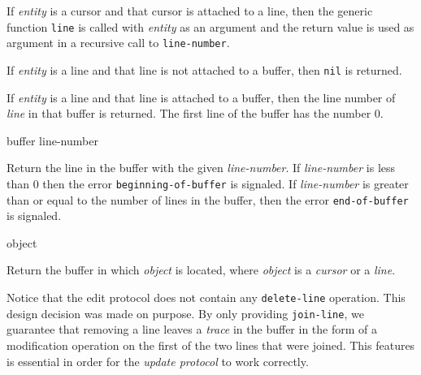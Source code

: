 If \textit{entity} is a cursor and that cursor is attached to a line,
then the generic function \texttt{line}  is
called with \textit{entity} as an argument and the return value is
used as argument in a recursive call to \texttt{line-number}.

If \textit{entity} is a line and that line is not attached to a
buffer, then \texttt{nil} is returned.

If \textit{entity} is a line and that line is attached to a buffer,
then the line number of \textit{line} in that buffer is returned.  The
first line of the buffer has the number $0$.

 {buffer line-number}

Return the line in the buffer with the given \textit{line-number}.  If
\textit{line-number} is less than $0$ then the error
\texttt{beginning-of-buffer} is signaled.  If \textit{line-number} is
greater than or equal to the number of lines in the buffer, then the
error \texttt{end-of-buffer} is signaled.

 {object}

Return the buffer in which \textit{object} is located, where
\textit{object} is a \emph{cursor} or a \emph{line}.

Notice that the edit protocol does not contain any
\texttt{delete-line} operation.  This design decision was made on
purpose.  By only providing \texttt{join-line}, we guarantee that
removing a line leaves a \emph{trace} in the buffer in the form of a
modification operation on the first of the two lines that were
joined.  This features is essential in order for the \emph{update
  protocol} to work correctly.
